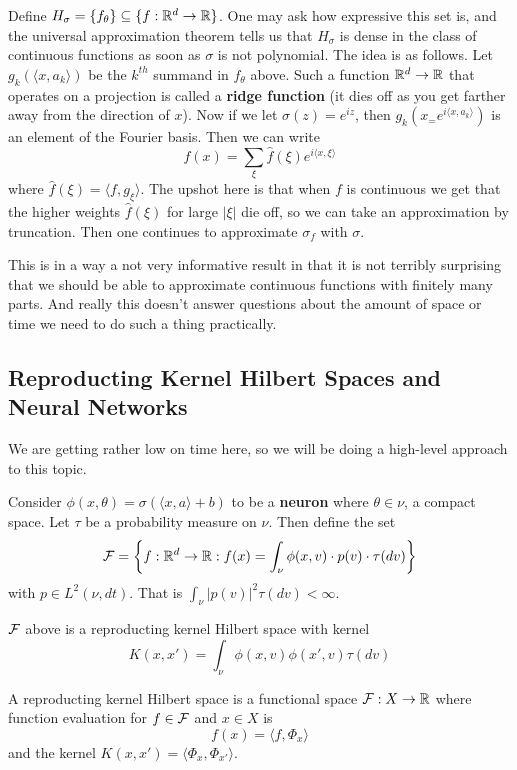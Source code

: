 \documentclass[12pt]{article}
\begin{document}
Define $H_\sigma=\{f_\theta\}\subseteq\{f:\mathbb{R}^d\to\mathbb{R}\}$. One may ask how expressive this set is, and the universal approximation theorem tells us that $H_\sigma$ is dense in the class of continuous functions as soon as $\sigma$ is not polynomial.
The idea is as follows. Let $g_k(\langle x,a_k\rangle)$ be the $k^{th}$ summand in $f_\theta$ above. Such a function $\mathbb{R}^d\to\mathbb{R}$ that operates on a projection is called a \textbf{ridge function} (it dies off as you get farther away from the direction of $x$).
Now if we let $\sigma(z)=e^{iz}$, then $g_k(x_=e^{i\langle x,a_k\rangle})$ is an element of the Fourier basis. Then we can write 
\[f(x)=\sum_\xi \hat f(\xi)e^{i\langle x,\xi\rangle}\]
where $\hat f(\xi)=\langle f,g_\xi\rangle$. The upshot here is that when $f$ is continuous we get that the higher weights $\hat f(\xi)$ for large $|\xi|$ die off,
so we can take an approximation by truncation. Then one continues to approximate $\sigma_f$ with $\sigma$.

\begin{rmk}
	This is in a way a not very informative result in that it is not terribly surprising that we should be able to approximate continuous functions with finitely many parts. And really this doesn't answer questions about the amount of space or time we need to do such a thing practically.
\end{rmk}

\subsection{Reproducting Kernel Hilbert Spaces and Neural Networks}
We are getting rather low on time here, so we will be doing a high-level approach to this topic.

Consider $\phi(x,\theta)=\sigma(\langle x,a\rangle+b)$ to be a \textbf{neuron} where $\theta\in\nu$, a compact space. Let $\tau$ be a probability measure on $\nu$. Then define the set 
\[\mathcal{F}=\left\{f:\mathbb{R}^d\to\mathbb{R}:f(x)=\int_\nu\phi(x,v)\cdot p(v)\cdot\tau(dv)\right\}\]
with $p\in L^2(\nu,dt).$ That is $\int_\nu |p(v)|^2\tau(dv)<\infty$.
\begin{prop}[Bach '17]
	$\mathcal{F}$ above is a reproducting kernel Hilbert space with kernel 
	\[K(x,x')=\int_\nu\phi(x,v)\phi(x',v)\tau(dv)\]
\end{prop}
\begin{defn}
	A reproducting kernel Hilbert space is a functional space $\mathcal{F}:X\to\mathbb{R}$ where function evaluation for $f\in\mathcal{F}$ and $x\in X$ is 
	\[f(x)=\langle f,\Phi_x\rangle\]
	and the kernel $K(x,x')=\langle\Phi_x,\Phi_{x'}\rangle.$
\end{defn}
\end{document}

